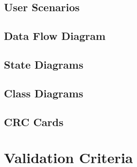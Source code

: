 \documentclass[a4]{article}
\begin{document}
\subsection{User Scenarios}

\subsection{Data Flow Diagram}

\subsection{State Diagrams}

\subsection{Class Diagrams}

\subsection{CRC Cards}


\section{Validation Criteria}
\end{document}
